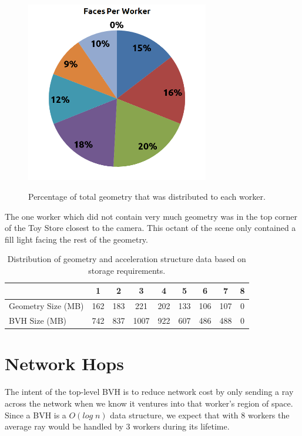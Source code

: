 \documentclass[12pt]{ucthesis}
\newcommand{\captionfonts}{\small\bf\ssp}
\begin{document}
\begin{figure}[h!]
    \centering
    \includegraphics[width=80mm]{figures/facesperworker.png}
    \captionfonts
    \caption{Percentage of total geometry that was distributed to each worker.}
    \label{fig:geomdist}
\end{figure}

The one worker which did not contain very much geometry was in the top corner
of the Toy Store closest to the camera. This octant of the scene only contained
a fill light facing the rest of the geometry.

\begin{table}
\begin{center}
\begin{tabular}{|l||c|c|c|c|c|c|c|c|}
    \hline
    & 1 & 2 & 3 & 4 & 5 & 6 & 7 & 8 \\
    \hline
    \hline
    Geometry Size (MB) & 162 & 183 & 221 & 202 & 133 & 106 & 107 & 0 \\
    \hline
    BVH Size (MB) & 742 & 837 & 1007 & 922 & 607 & 486 & 488 & 0 \\
    \hline
\end{tabular}
\caption{Distribution of geometry and acceleration structure data based on storage requirements.}
\label{tb:geomsize}
\end{center}
\end{table}

\section{Network Hops}
\label{nethops}

The intent of the top-level BVH is to reduce network cost by only sending
a ray across the network when we know it ventures into that worker's region
of space. Since a BVH is a $O(log\;n)$ data structure, we expect that with 8
workers the average ray would be handled by 3 workers during its lifetime.
\end{document}
